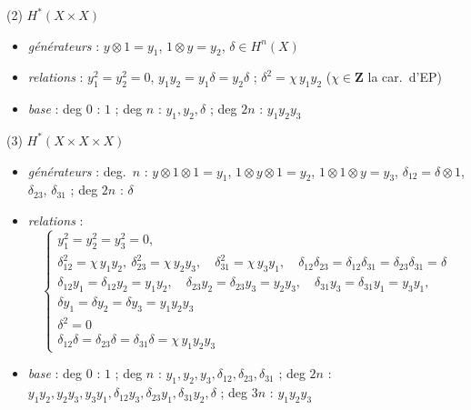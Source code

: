 \documentclass[11pt,a4paper]{article}
\begin{document}
(2) $H^{*}(X \times X)$

\begin{itemize}
  \item \emph{générateurs} : $y \otimes 1 = y_{1}$, $1 \otimes y = y_{2}$,
  $\delta \in H^{n}(X)$
  \item \emph{relations} : $y_{1}^{2} = y_{2}^{2} = 0$,
  $y_{1} y_{2} = y_{1} \delta = y_{2} \delta$ ; $\delta^{2} = \chi\, y_{1} y_{2}$
  ($\chi \in \mathbf{Z}$ la car.\ d'EP)
  \item \emph{base} : deg $0$ : $1$ ; deg $n$ : $y_{1}, y_{2}, \delta$ ;
  deg $2n$ : $y_{1} y_{2} y_{3}$
\end{itemize}

(3) $H^{*}(X \times X \times X)$

\begin{itemize}
  \item \emph{générateurs} : deg.\ $n$ : $y \otimes 1 \otimes 1 = y_{1}$,
  $1 \otimes y \otimes 1 = y_{2}$, $1 \otimes 1 \otimes y = y_{3}$,
  $\delta_{12} = \delta \otimes 1$, $\delta_{23}$, $\delta_{31}$ ;
  deg $2n$ : $\delta$
  \item \emph{relations} :
  \[
  \left\{
  \begin{array}{l}
    y_{1}^{2} = y_{2}^{2} = y_{3}^{2} = 0 ,\\
    \delta_{12}^{2} = \chi\, y_{1} y_{2} ,\ \delta_{23}^{2} = \chi\, y_{2} y_{3} ,\quad
    \delta_{31}^{2} = \chi\, y_{3} y_{1} ,\quad
    \delta_{12} \delta_{23} = \delta_{12} \delta_{31} = \delta_{23} \delta_{31} = \delta \\
    \delta_{12} y_{1} = \delta_{12} y_{2} = y_{1} y_{2} ,\quad
    \delta_{23} y_{2} = \delta_{23} y_{3} = y_{2} y_{3} ,\quad
    \delta_{31} y_{3} = \delta_{31} y_{1} = y_{3} y_{1} ,\\
    \delta y_{1} = \delta y_{2} = \delta y_{3} = y_{1} y_{2} y_{3} \\
    \delta^{2} = 0 \\
    \delta_{12} \delta = \delta_{23} \delta = \delta_{31} \delta = \chi\, y_{1} y_{2} y_{3}
  \end{array}
  \right.
  \]
  \item \emph{base} : deg $0$ : $1$ ;
  deg $n$ : $y_{1}, y_{2}, y_{3}, \delta_{12}, \delta_{23}, \delta_{31}$ ;
  deg $2n$ : $y_{1} y_{2}, y_{2} y_{3}, y_{3} y_{1}, \delta_{12} y_{3},
  \delta_{23} y_{1}, \delta_{31} y_{2}, \delta$ ;
  deg $3n$ : $y_{1} y_{2} y_{3}$
\end{itemize}
\end{document}
